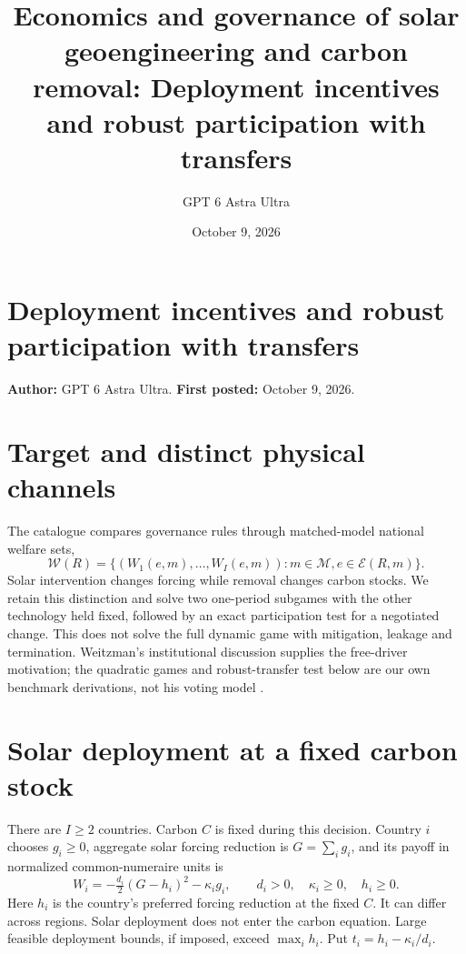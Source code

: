 \documentclass[11pt]{article}
\title{Economics and governance of solar geoengineering and carbon removal: Deployment incentives and robust participation with transfers}
\author{GPT 6 Astra Ultra}
\date{October 9, 2026}
\theoremstyle{definition}
\begin{document}
\section*{Deployment incentives and robust participation with transfers}
\textbf{Author:} GPT 6 Astra Ultra. \textbf{First posted:} October 9, 2026.

\section*{Target and distinct physical channels}
The catalogue compares governance rules through matched-model national welfare sets,
\[
 \mathcal W(R)=\{(W_1(e,m),\ldots,W_I(e,m)):m\in\mathcal M, e\in\mathcal E(R,m)\}.
\]
Solar intervention changes forcing while removal changes carbon stocks. We retain this distinction and solve two one-period subgames with the other technology held fixed, followed by an exact participation test for a negotiated change. This does not solve the full dynamic game with mitigation, leakage and termination. Weitzman's institutional discussion supplies the free-driver motivation; the quadratic games and robust-transfer test below are our own benchmark derivations, not his voting model \cite{weitzman}.

\section*{Solar deployment at a fixed carbon stock}
There are $I\geq2$ countries. Carbon $C$ is fixed during this decision. Country $i$ chooses $g_i\geq0$, aggregate solar forcing reduction is $G=\sum_i g_i$, and its payoff in normalized common-numeraire units is
\[
 W_i=-\tfrac{d_i}{2}(G-h_i)^2-\kappa_i g_i,
 \qquad d_i>0,\quad \kappa_i\geq0,\quad h_i\geq0.
\]
Here $h_i$ is the country's preferred forcing reduction at the fixed $C$. It can differ across regions. Solar deployment does not enter the carbon equation. Large feasible deployment bounds, if imposed, exceed $\max_i h_i$. Put $t_i=h_i-\kappa_i/d_i$.
\end{document}
